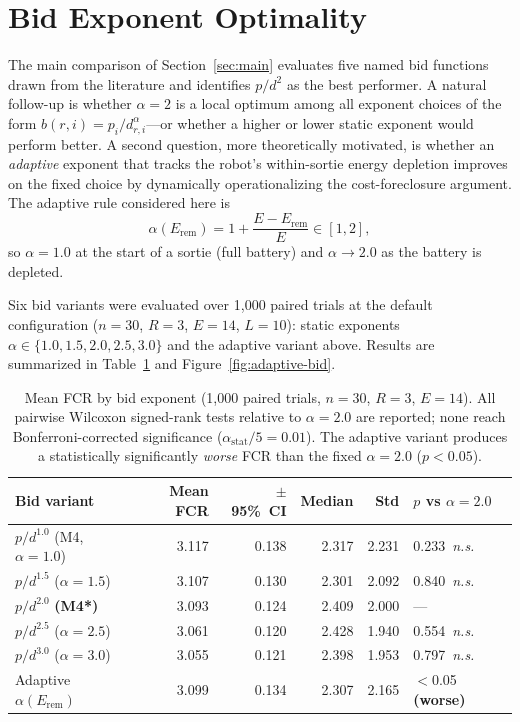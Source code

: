 \section{Bid Exponent Optimality}\label{sec:exp6-alpha}

The main comparison of Section~\ref{sec:main} evaluates five named bid
functions drawn from the literature and identifies $p/d^2$ as the best
performer.
A natural follow-up is whether $\alpha = 2$ is a local optimum among all
exponent choices of the form $b(r, i) = p_i / d_{r,i}^\alpha$---or
whether a higher or lower static exponent would perform better.
A second question, more theoretically motivated, is whether an
\emph{adaptive} exponent that tracks the robot's within-sortie energy
depletion improves on the fixed choice by dynamically operationalizing
the cost-foreclosure argument.
The adaptive rule considered here is
\[
  \alpha(E_{\mathrm{rem}}) = 1 + \frac{E - E_{\mathrm{rem}}}{E} \in [1, 2],
\]
so $\alpha = 1.0$ at the start of a sortie (full battery) and $\alpha
\to 2.0$ as the battery is depleted.

Six bid variants were evaluated over 1,000 paired trials at the default
configuration ($n = 30$, $R = 3$, $E = 14$, $L = 10$):
static exponents $\alpha \in \{1.0, 1.5, 2.0, 2.5, 3.0\}$ and the
adaptive variant above.
Results are summarized in Table~\ref{tab:alpha-sweep} and
Figure~\ref{fig:adaptive-bid}.

\begin{table}[ht]
\centering
\caption{Mean FCR by bid exponent (1,000 paired trials, $n = 30$, $R = 3$,
  $E = 14$). All pairwise Wilcoxon signed-rank tests relative to
  $\alpha = 2.0$ are reported; none reach Bonferroni-corrected significance
  ($\alpha_{\mathrm{stat}}/5 = 0.01$). The adaptive variant produces a
  statistically significantly \emph{worse} FCR than the fixed
  $\alpha = 2.0$ ($p < 0.05$).}\label{tab:alpha-sweep}
\vspace{2pt}
\begin{tabular}{@{}lrrrrl@{}}
\toprule
\textbf{Bid variant} & \textbf{Mean FCR} & \textbf{$\pm$95\%~CI}
  & \textbf{Median} & \textbf{Std} & \textbf{$p$ vs $\alpha=2.0$} \\
\midrule
$p/d^{1.0}$ (M4, $\alpha=1.0$)   & 3.117 & 0.138 & 2.317 & 2.231 & 0.233~\textit{n.s.} \\
$p/d^{1.5}$ ($\alpha=1.5$)        & 3.107 & 0.130 & 2.301 & 2.092 & 0.840~\textit{n.s.} \\
$p/d^{2.0}$ \textbf{(M4*)}        & 3.093 & 0.124 & 2.409 & 2.000 & --- \\
$p/d^{2.5}$ ($\alpha=2.5$)        & 3.061 & 0.120 & 2.428 & 1.940 & 0.554~\textit{n.s.} \\
$p/d^{3.0}$ ($\alpha=3.0$)        & 3.055 & 0.121 & 2.398 & 1.953 & 0.797~\textit{n.s.} \\
Adaptive $\alpha(E_{\mathrm{rem}})$     & 3.099 & 0.134 & 2.307 & 2.165 & $<$0.05 \textbf{(worse)} \\
\bottomrule
\end{tabular}
\end{table}

